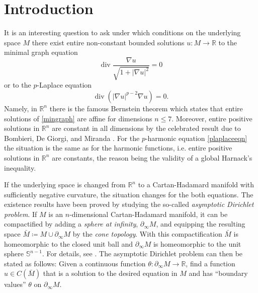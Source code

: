\documentclass[10pt,a4paper,reqno]{amsart}
\newcommand{\R}{\mathbb{R}}
\newcommand{\Ss}{\mathbb{S}}
\DeclareMathOperator\dv{div}
\newcommand{\pinf}{\partial_{\infty}}
\numberwithin{equation}{section}
\theoremstyle{plain}
\theoremstyle{definition}
\begin{document}
\section{Introduction}
It is an interesting question to ask under which conditions on the underlying space $M$ there exist entire non-constant
bounded solutions $u\colon M\to\R$ to the minimal graph equation
  \begin{equation}\label{mingraph}
    \dv \frac{\nabla u}{\sqrt{1+|\nabla u|^2}} = 0
  \end{equation}
or to the $p$-Laplace equation
  \begin{equation}\label{plaplaceeqn}
   \dv (|\nabla u|^{p-2} \nabla u) = 0.
  \end{equation}
Namely, in $\R^n$ there is the famous Bernstein theorem which states that entire solutions of \eqref{mingraph}
are affine for dimensions $n\le 7$. Moreover, entire positive solutions in $\R^n$ are constant in all dimensions by the celebrated result due to Bombieri, De Giorgi, and Miranda \cite{bombieri}. For the $p$-harmonic equation \eqref{plaplaceeqn}
the situation is the same as for the harmonic functions, i.e. entire positive solutions in $\R^n$ are constants, the reason being the validity of 
a global Harnack's inequality.  

If the underlying space is changed from $\R^n$ to a Cartan-Hadamard manifold with sufficiently negative curvature, 
the situation changes for the both equations. The existence results have been proved by studying the
so-called \emph{asymptotic Dirichlet problem}. If $M$ is an $n$-dimensional Cartan-Hadamard manifold, it can be compactified
by adding a \emph{sphere at infinity}, $\pinf M$, and equipping the resulting space $\bar M \coloneqq M \cup 
\pinf M$ by the \emph{cone topology}. With this compactification $\bar M$ is homeomorphic to the closed
unit ball and $\pinf M$ is homeomorphic to the unit sphere $\Ss^{n-1}$. For details, see \cite{EO}. The asymptotic 
Dirichlet problem can then be stated
as follows: Given a continuous function $\theta \colon \pinf M \to \R$, find a function $u \in C(\bar M)$
that is a solution to the desired equation in $M$ and has ``boundary values'' $\theta$ on $\pinf M$.
\end{document}
